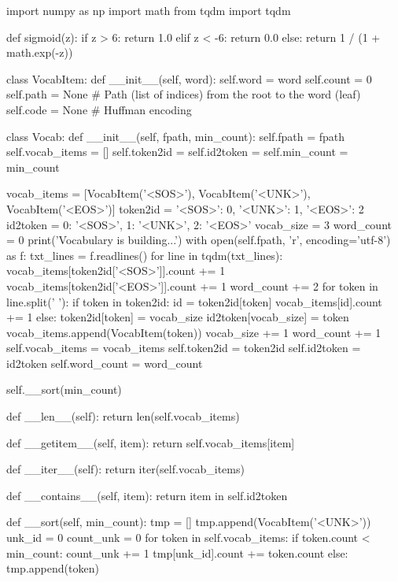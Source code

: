 \begin{python}
import numpy as np
import math
from tqdm import tqdm

def sigmoid(z):
    if z > 6:
        return 1.0
    elif z < -6:
        return 0.0
    else:
        return 1 / (1 + math.exp(-z))

class VocabItem:
    def __init__(self, word):
        self.word = word
        self.count = 0
        self.path = None # Path (list of indices) from the root to the word (leaf)
        self.code = None # Huffman encoding

class Vocab:
    def __init__(self, fpath, min_count):
        self.fpath = fpath
        self.vocab_items = []
        self.token2id = {}
        self.id2token = {}
        self.min_count = min_count

        vocab_items = [VocabItem('<SOS>'), VocabItem('<UNK>'), VocabItem('<EOS>')]
        token2id = {'<SOS>': 0, '<UNK>': 1, '<EOS>': 2}
        id2token = {0: '<SOS>', 1: '<UNK>', 2: '<EOS>'}
        vocab_size = 3
        word_count = 0
        print('Vocabulary is building...')
        with open(self.fpath, 'r', encoding='utf-8') as f:
            txt_lines = f.readlines()
        for line in tqdm(txt_lines):
            vocab_items[token2id['<SOS>']].count += 1
            vocab_items[token2id['<EOS>']].count += 1
            word_count += 2
            for token in line.split(' '):
                if token in token2id:
                    id = token2id[token]
                    vocab_items[id].count += 1
                else:
                    token2id[token] = vocab_size
                    id2token[vocab_size] = token
                    vocab_items.append(VocabItem(token))
                    vocab_size += 1
                word_count += 1
        self.vocab_items = vocab_items
        self.token2id = token2id
        self.id2token = id2token
        self.word_count = word_count

        self.__sort(min_count)

    def __len__(self):
        return len(self.vocab_items)

    def __getitem__(self, item):
        return self.vocab_items[item]

    def __iter__(self):
        return iter(self.vocab_items)

    def __contains__(self, item):
        return item in self.id2token

    def __sort(self, min_count):
        tmp = []
        tmp.append(VocabItem('<UNK>'))
        unk_id = 0
        count_unk = 0
        for token in self.vocab_items:
            if token.count < min_count:
                count_unk += 1
                tmp[unk_id].count += token.count
            else:
                tmp.append(token)


\end{python}

